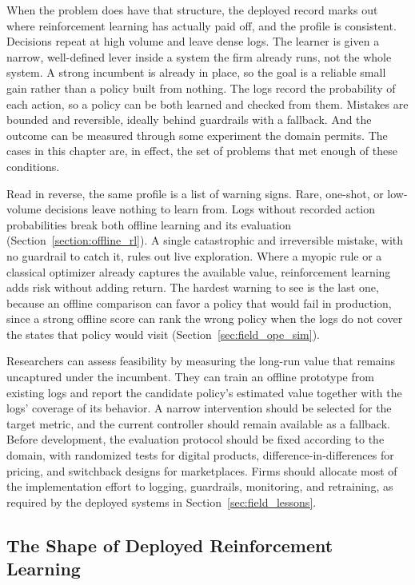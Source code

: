 When the problem does have that structure, the deployed record marks out where reinforcement learning has actually paid off, and the profile is consistent. Decisions repeat at high volume and leave dense logs. The learner is given a narrow, well-defined lever inside a system the firm already runs, not the whole system. A strong incumbent is already in place, so the goal is a reliable small gain rather than a policy built from nothing. The logs record the probability of each action, so a policy can be both learned and checked from them. Mistakes are bounded and reversible, ideally behind guardrails with a fallback. And the outcome can be measured through some experiment the domain permits. The cases in this chapter are, in effect, the set of problems that met enough of these conditions.

Read in reverse, the same profile is a list of warning signs. Rare, one-shot, or low-volume decisions leave nothing to learn from. Logs without recorded action probabilities break both offline learning and its evaluation (Section~\ref{section:offline_rl}). A single catastrophic and irreversible mistake, with no guardrail to catch it, rules out live exploration. Where a myopic rule or a classical optimizer already captures the available value, reinforcement learning adds risk without adding return. The hardest warning to see is the last one, because an offline comparison can favor a policy that would fail in production, since a strong offline score can rank the wrong policy when the logs do not cover the states that policy would visit (Section~\ref{sec:field_ope_sim}).

Researchers can assess feasibility by measuring the long-run value that remains uncaptured under the incumbent. They can train an offline prototype from existing logs and report the candidate policy's estimated value together with the logs' coverage of its behavior. A narrow intervention should be selected for the target metric, and the current controller should remain available as a fallback. Before development, the evaluation protocol should be fixed according to the domain, with randomized tests for digital products, difference-in-differences for pricing, and switchback designs for marketplaces. Firms should allocate most of the implementation effort to logging, guardrails, monitoring, and retraining, as required by the deployed systems in Section~\ref{sec:field_lessons}.

\subsection{The Shape of Deployed Reinforcement Learning}
\label{sec:field_shape}

